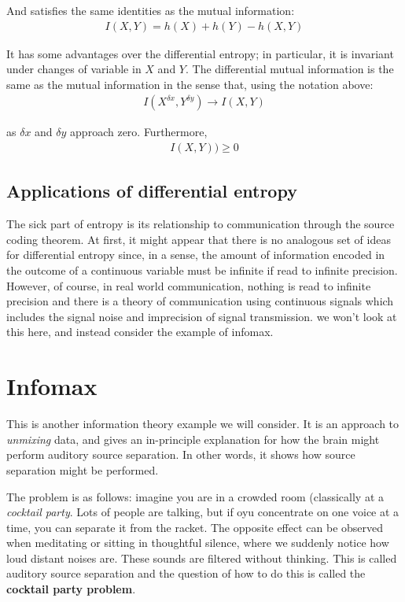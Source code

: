 \documentclass[11pt,a4paper,titlepage,dvipsnames,cmyk]{scrartcl}
\begin{document}
And satisfies the same identities as the mutual information:
\begin{align*}
I(X,Y) = h(X) + h(Y) - h(X,Y)
\end{align*}

It has some advantages over the differential entropy; in particular, it is invariant under changes of variable in $X$ and $Y$. The differential mutual information is the same as the mutual information in the sense that, using the notation above:
\begin{align*}
I(X^{\delta x}, Y^{\delta y}) \rightarrow I(X,Y)
\end{align*}

as $\delta x$ and $\delta y$ approach zero. Furthermore,
\begin{align*}
I(X,Y)) \ge 0
\end{align*}

\subsection{Applications of differential entropy}
The sick part of entropy is its relationship to communication through the source coding theorem. At first, it might appear that there is no analogous set of ideas for differential entropy since, in a sense, the amount of information encoded in the outcome of a continuous variable must be infinite if read to infinite precision. However, of course, in real world communication, nothing is read to infinite precision and there is a theory of communication using continuous signals which includes the signal noise and imprecision of signal transmission. we won't look at this here, and instead consider the example of infomax.

\section{Infomax}
This is another information theory example we will consider. It is an approach to \textit{unmixing} data, and gives an in-principle explanation for how the brain might perform auditory source separation. In other words, it shows how source separation might be performed.

The problem is as follows: imagine you are in a crowded room (classically at a \textit{cocktail party}. Lots of people are talking, but if oyu concentrate on one voice at a time, you can separate it from the racket. The opposite effect can be observed when meditating or sitting in thoughtful silence, where we suddenly notice how loud distant noises are. These sounds are filtered without thinking. This is called auditory source separation and the question of how to do this is called the \textbf{cocktail party problem}.
\end{document}

